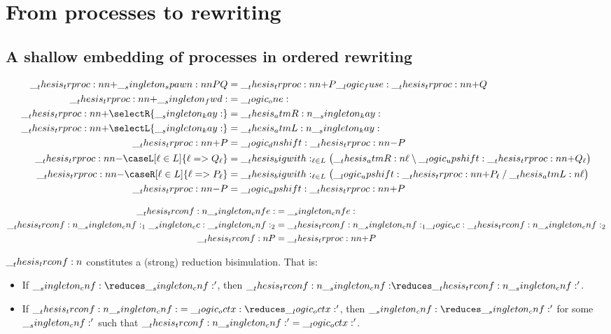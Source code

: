 \chapter{From processes to rewriting}

\section{A shallow embedding of processes in ordered rewriting}


\begin{equation*}
  \begin{aligned}
    \trproc[+]{\spawn{P}{Q}} &= \trproc[+]{P} \fuse \trproc[+]{Q} \\
    \trproc[+]{\fwd} &= \one \\
    \trproc[+]{\selectR{\kay}} &= \atmR{\kay} \\
    \trproc[+]{\selectL{\kay}} &= \atmL{\kay} \\
    \trproc[+]{P} &= \dn \trproc[-]{P}
    \\
    \trproc[-]{\caseL[\ell \in L]{\ell => Q_{\ell}}} &= \bigwith_{\ell \in L}\bigl(\atmR{\ell} \limp \up \trproc[+]{Q_{\ell}}\bigr) \\
    \trproc[-]{\caseR[\ell \in L]{\ell => P_{\ell}}} &= \bigwith_{\ell \in L}\bigl(\up \trproc[+]{P_{\ell}} \pmir \atmL{\ell}\bigr) \\
    \trproc[-]{P} &= \up \trproc[+]{P}
  \end{aligned}
\end{equation*}

\begin{equation*}
  \begin{aligned}
    \trconf{\cnfe} &= \cnfe \\
    \trconf{\cnf_1 \cc \cnf_2} &= \trconf{\cnf_1} \oc \trconf{\cnf_2} \\
    \trconf{P} &= \trproc[+]{P}
  \end{aligned}
\end{equation*}

\begin{theorem}
  $\__thesis_trconf:n {}$ constitutes a (strong) reduction bisimulation.
  That is:
  \begin{itemize}[nosep]
  \item If $\cnf \reduces \cnf'$, then $\trconf{\cnf} \reduces \trconf{\cnf'}$.
  \item If $\trconf{\cnf} = \octx \reduces \octx'$, then $\cnf \reduces \cnf'$ for some $\__singleton_cnf:'$ such that $\__thesis_trconf:n {\__singleton_cnf:'} = \__logic_octx:'$.
  \end{itemize}
\end{theorem}

